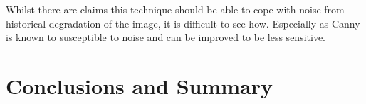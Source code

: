 \documentclass[conference]{IEEEtran}
\begin{document}
Whilst there are claims this technique should be able to cope with noise from
historical degradation of the image, it is difficult to see how. Especially as
Canny is known to susceptible to noise and can be improved to be less
sensitive\cite{xiao10improved}.

\section{Conclusions and Summary}









\end{document}
